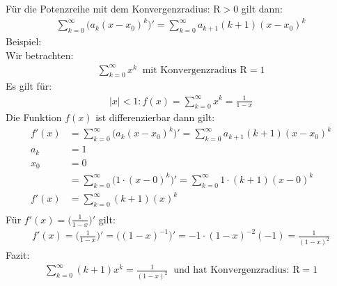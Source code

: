 Für die Potenzreihe mit dem Konvergenzradius: $ \mathrm{R}>0 $ gilt dann:\\
\begin{align*}
	\sum\limits_{k=0}^{\infty}\big(a_k(x-x_0)^k\big)'=\sum\limits_{k=0}^{\infty}a_{k+1}(k+1)(x-x_0)^{k}
\end{align*}
Beispiel:\\
Wir betrachten:\\
\begin{align*}
	\sum\limits_{k=0}^{\infty} x^k\;\;\text{mit Konvergenzradius }\mathrm{R}=1
\end{align*}
Es gilt für:\\
\begin{align*}
	|x|<1 : f(x)=\sum\limits_{k=0}^{\infty}x^k=\frac{1}{1-x}
\end{align*}
Die Funktion $ f(x) $ ist differenzierbar dann gilt:\\
\begin{align*}
	f'(x)&=\sum\limits_{k=0}^{\infty}\big(a_k(x-x_0)^k\big)'=\sum\limits_{k=0}^{\infty}a_{k+1}(k+1)(x-x_0)^{k}\\
	a_k&=1\\
	x_0&=0\\
&=\sum\limits_{k=0}^{\infty}\big(1\cdot(x-0)^k\big)'=\sum\limits_{k=0}^{\infty}1\cdot(k+1)(x-0)^k\\
	f'(x)	&=\sum\limits_{k=0}^{\infty}(k+1)(x)^k\\
\end{align*}
Für $ f'(x)=\big(\frac{1}{1-x}\big)' $ gilt:\\
\begin{align*}
	f'(x)=\bigg(\frac{1}{1-x}\bigg)'=\bigg((1-x)^{-1}\bigg)'=-1\cdot(1-x)^{-2}(-1)=\frac{1}{(1-x)^2}
\end{align*}
Fazit:\\
\begin{align*}
	\sum\limits_{k=0}^{\infty}(k+1)x^k=\frac{1}{(1-x)^2}\;\;\text{und hat Konvergenzradius: }\mathrm{R}=1
\end{align*}
\newpage
\noindent
